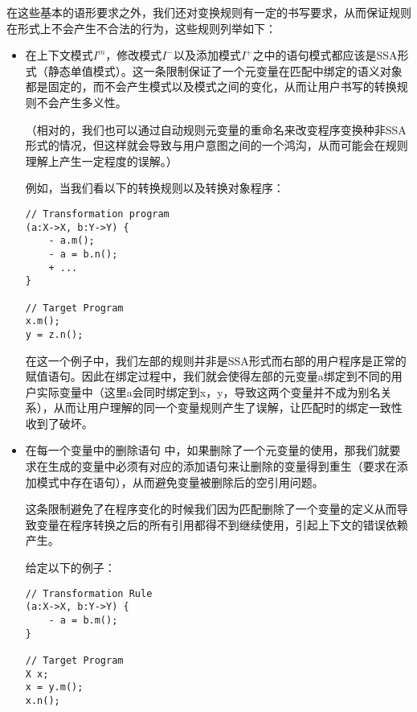 在这些基本的语形要求之外，我们还对变换规则有一定的书写要求，从而保证规则在形式上不会产生不合法的行为，这些规则列举如下：
\begin{itemize}
\item 在上下文模式$I^{m}$，修改模式$I^-$以及添加模式$I^{+}$之中的语句模式都应该是SSA形式（静态单值模式）。这一条限制保证了一个元变量在匹配中绑定的语义对象都是固定的，而不会产生模式以及模式之间的变化，从而让用户书写的转换规则不会产生多义性。

（相对的，我们也可以通过自动规则元变量的重命名来改变程序变换种非SSA形式的情况，但这样就会导致与用户意图之间的一个鸿沟，从而可能会在规则理解上产生一定程度的误解。）

例如，当我们看以下的转换规则以及转换对象程序：

\begin{center}
\begin{smpage}{0.5\columnwidth}
\begin{lstlisting}[style=patl]
// Transformation program
(a:X->X, b:Y->Y) {
	- a.m();
	- a = b.n();
	+ ...
}

// Target Program
x.m();
y = z.n();
\end{lstlisting}
\end{smpage}
\end{center}

在这一个例子中，我们左部的规则并非是SSA形式而右部的用户程序是正常的赋值语句。因此在绑定过程中，我们就会使得左部的元变量a绑定到不同的用户实际变量中（这里a会同时绑定到x，y，导致这两个变量并不成为别名关系），从而让用户理解的同一个变量规则产生了误解，让匹配时的绑定一致性收到了破坏。

\item 在每一个变量中的删除语句 中，如果删除了一个元变量的使用，那我们就要求在生成的变量中必须有对应的添加语句来让删除的变量得到重生（要求在添加模式中存在语句），从而避免变量被删除后的空引用问题。

这条限制避免了在程序变化的时候我们因为匹配删除了一个变量的定义从而导致变量在程序转换之后的所有引用都得不到继续使用，引起上下文的错误依赖产生。

给定以下的例子：

\begin{center}
\begin{smpage}{0.5\columnwidth}
\begin{lstlisting}[style=patl]
// Transformation Rule
(a:X->X, b:Y->Y) {
	- a = b.m();
}

// Target Program
X x;
x = y.m();
x.n();
\end{lstlisting}
\end{smpage}
\end{center}


\end{itemize}
